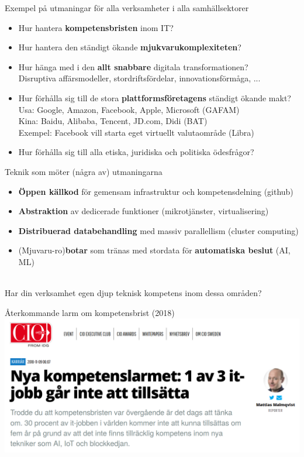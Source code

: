 \documentclass[aspectratio=169]{beamer}
\newenvironment{Slide}[1]%
  {\begin{frame}[environment=Slide]{#1}}
  {\end{frame}}%
\begin{document}
\begin{Slide}{Exempel på utmaningar för alla verksamheter i alla samhällsektorer}
  \begin{itemize}
    \item Hur hantera \textbf{kompetensbristen} inom IT?
    \item Hur hantera den ständigt ökande \textbf{mjukvarukomplexiteten}?
    \item Hur hänga med i den \textbf{allt snabbare} digitala transformationen? \\ Disruptiva affärsmodeller, stordriftsfördelar, innovationsförmåga, ... 
    \item Hur förhålla sig till de stora \textbf{plattformsföretagens} ständigt ökande makt? \\ 
          Usa: Google, Amazon, Facebook, Apple, Microsoft \hfill(GAFAM)\\
          Kina: Baidu, Alibaba, Tencent, JD.com, Didi \hfill (BAT) \\
          Exempel: Facebook vill starta eget virtuellt valutaområde \hfill (Libra)
    \item Hur förhålla sig till alla etiska, juridiska och politiska ödesfrågor?
  \end{itemize}
\end{Slide}

\begin{Slide}{Teknik som möter (några av) utmaningarna}
  \begin{itemize}
    \item \textbf{Öppen källkod} för gemensam infrastruktur och kompetensdelning (github)
    \item \textbf{Abstraktion} av dedicerade funktioner (mikrotjänster, virtualisering)
    \item \textbf{Distribuerad databehandling} med massiv parallellism (cluster computing)
    \item (Mjuvaru-ro)\textbf{botar} som tränas med stordata för \textbf{automatiska beslut} (AI, ML)
  \end{itemize}
  ~\\Har din verksamhet egen djup teknisk kompetens inom dessa områden?
\end{Slide}



\begin{Slide}{Återkommande larm om kompetensbrist (2018)}
\includegraphics[height=0.75\textheight]{../../img/kompetenslarm-cio}
\end{Slide}
\end{document}
